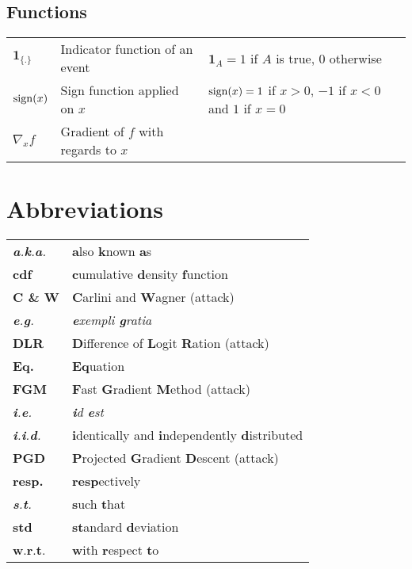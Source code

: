 \section*{Functions}
\begin{tabular}{lll}
     $\mathbf{1}_{\{.\}}$ & Indicator function of an event & $\mathbf{1}_{A} = 1$ if $A$ is true, $0$ otherwise  \\
     $\operatorname*{sign}(x)$ & Sign function applied on $x$ & $\operatorname*{sign}(x)= 1$ if $x>0$, $-1$ if $x<0$ and $1$ if $x=0$ \\
     $\nabla_xf$ & Gradient of $f$ with regards to $x$\\
\end{tabular}

 
\chapter*{Abbreviations}

\begin{tabular}{ll} 
\emph{\textbf{a}.\textbf{k}.\textbf{a}.} & \textbf{a}lso \textbf{k}nown \textbf{a}s\\
\textbf{cdf} & \textbf{c}umulative \textbf{d}ensity \textbf{f}unction \\
\textbf{C \& W} & \textbf{C}arlini and \textbf{W}agner (attack)\\
\emph{\textbf{e}.\textbf{g}.} & \emph{\textbf{e}xempli \textbf{g}ratia} \\
\textbf{DLR} & \textbf{D}ifference of \textbf{L}ogit \textbf{R}ation (attack)\\
\textbf{Eq.} & \textbf{Eq}uation \\
\textbf{FGM} & \textbf{F}ast \textbf{G}radient \textbf{M}ethod (attack)\\
\emph{\textbf{i}.\textbf{e}.} & \emph{\textbf{i}d \textbf{e}st} \\
\emph{\textbf{i}.\textbf{i}.\textbf{d}.} & \textbf{i}dentically and \textbf{i}ndependently \textbf{d}istributed \\
\textbf{PGD} & \textbf{P}rojected \textbf{G}radient \textbf{D}escent (attack)\\
\textbf{resp.} & \textbf{resp}ectively \\
\emph{\textbf{s}.\textbf{t}.} & \textbf{s}uch \textbf{t}hat \\
\textbf{std} & \textbf{st}andard \textbf{d}eviation \\
\textbf{w}.\textbf{r}.\textbf{t}. & \textbf{w}ith \textbf{r}espect \textbf{t}o 
\end{tabular}

